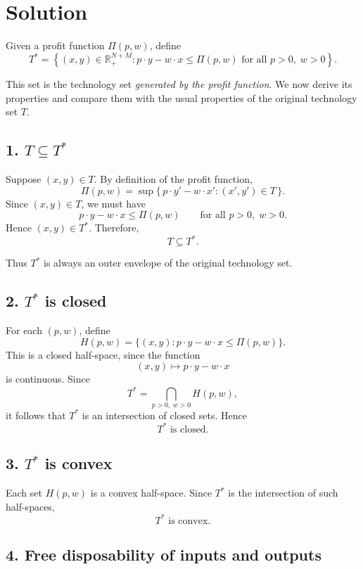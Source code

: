 \section*{Solution}

Given a profit function \(\Pi(p,w)\), define
\[
T^*
=
\left\{
(x,y)\in \mathbb{R}_+^{N+M}
:
p\cdot y-w\cdot x\le \Pi(p,w)
\text{ for all } p>0,\; w>0
\right\}.
\]

This set is the technology set \emph{generated by the profit function}.  
We now derive its properties and compare them with the usual properties of the original technology set \(T\).

\subsection*{1. \(T \subseteq T^*\)}

Suppose \((x,y)\in T\). By definition of the profit function,
\[
\Pi(p,w)=\sup\{\,p\cdot y'-w\cdot x' : (x',y')\in T\,\}.
\]
Since \((x,y)\in T\), we must have
\[
p\cdot y-w\cdot x\le \Pi(p,w)
\qquad \text{for all } p>0,\; w>0.
\]
Hence \((x,y)\in T^*\). Therefore,
\[
\boxed{T\subseteq T^*.}
\]

Thus \(T^*\) is always an outer envelope of the original technology set.

\subsection*{2. \(T^*\) is closed}

For each \((p,w)\), define
\[
H(p,w)=\{(x,y): p\cdot y-w\cdot x\le \Pi(p,w)\}.
\]
This is a closed half-space, since the function
\[
(x,y)\mapsto p\cdot y-w\cdot x
\]
is continuous. Since
\[
T^*=\bigcap_{p>0,\;w>0} H(p,w),
\]
it follows that \(T^*\) is an intersection of closed sets. Hence
\[
\boxed{T^* \text{ is closed}.}
\]

\subsection*{3. \(T^*\) is convex}

Each set \(H(p,w)\) is a convex half-space. Since \(T^*\) is the intersection of such half-spaces,
\[
\boxed{T^* \text{ is convex}.}
\]

\subsection*{4. Free disposability of inputs and outputs}

